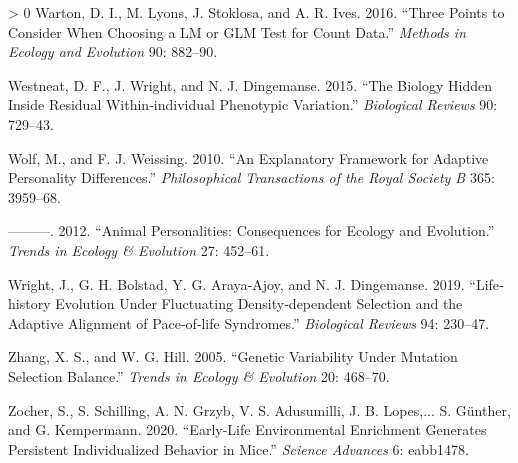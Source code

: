 \documentclass{article}
\newlength{\cslhangindent}
\newenvironment{CSLReferences}[3] %
 {%
  \setlength{\parindent}{0pt}
  \ifodd #1 \everypar{\setlength{\hangindent}{\cslhangindent}}\ignorespaces\fi
  \ifnum #2 > 0
  \setlength{\parskip}{#2\baselineskip}
  \fi
 }%
 {}
\begin{document}
\begin{CSLReferences}{1}{0}
\leavevmode\hypertarget{ref-Warton2016}{}%
Warton, D. I., M. Lyons, J. Stoklosa, and A. R. Ives. 2016. {``Three
Points to Consider When Choosing a LM or GLM Test for Count Data.''}
\emph{Methods in Ecology and Evolution} 90: 882--90.

\leavevmode\hypertarget{ref-Westneat2015}{}%
Westneat, D. F., J. Wright, and N. J. Dingemanse. 2015. {``The Biology
Hidden Inside Residual Within‐individual Phenotypic Variation.''}
\emph{Biological Reviews} 90: 729--43.

\leavevmode\hypertarget{ref-Wolf2010}{}%
Wolf, M., and F. J. Weissing. 2010. {``An Explanatory Framework for
Adaptive Personality Differences.''} \emph{Philosophical Transactions of
the Royal Society B} 365: 3959--68.

\leavevmode\hypertarget{ref-Wolf2012}{}%
---------. 2012. {``Animal Personalities: Consequences for Ecology and
Evolution.''} \emph{Trends in Ecology \& Evolution} 27: 452--61.

\leavevmode\hypertarget{ref-Wright2019}{}%
Wright, J., G. H. Bolstad, Y. G. Araya‐Ajoy, and N. J. Dingemanse. 2019.
{``Life‐history Evolution Under Fluctuating Density‐dependent Selection
and the Adaptive Alignment of Pace‐of‐life Syndromes.''}
\emph{Biological Reviews} 94: 230--47.

\leavevmode\hypertarget{ref-Zhang2005}{}%
Zhang, X. S., and W. G. Hill. 2005. {``Genetic Variability Under
Mutation Selection Balance.''} \emph{Trends in Ecology \& Evolution} 20:
468--70.

\leavevmode\hypertarget{ref-Zocher2020}{}%
Zocher, S., S. Schilling, A. N. Grzyb, V. S. Adusumilli, J. B. Lopes,...
S. Günther, and G. Kempermann. 2020. {``Early-Life Environmental
Enrichment Generates Persistent Individualized Behavior in Mice.''}
\emph{Science Advances} 6: eabb1478.

\end{CSLReferences}



\end{document}
